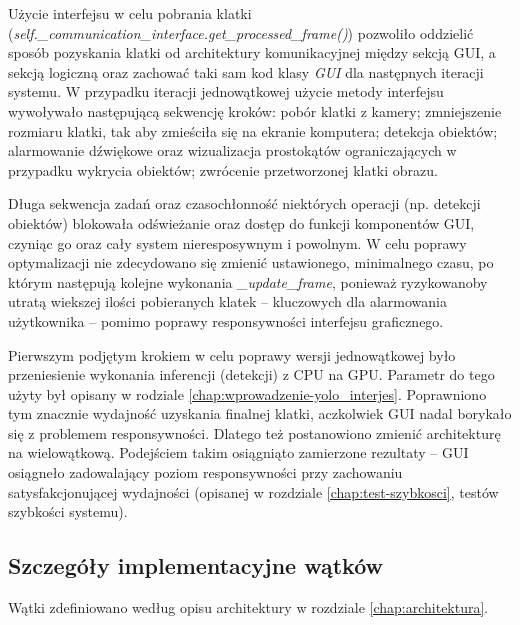 Użycie interfejsu w celu pobrania klatki (\emph{self.\_communication\_interface.get\_processed\_frame()}) pozwoliło oddzielić sposób pozyskania klatki od architektury komunikacyjnej między sekcją GUI, a sekcją logiczną oraz zachować taki sam kod klasy \emph{GUI} dla następnych iteracji systemu. W przypadku iteracji jednowątkowej użycie metody interfejsu wywoływało następującą sekwencję kroków: pobór klatki z kamery; zmniejszenie rozmiaru klatki, tak aby zmieściła się na ekranie komputera; detekcja obiektów; alarmowanie dźwiękowe oraz wizualizacja prostokątów ograniczających w przypadku wykrycia obiektów; zwrócenie przetworzonej klatki obrazu.

Długa sekwencja zadań oraz czasochłonność niektórych operacji (np. detekcji obiektów) blokowała odświeżanie oraz dostęp do funkcji komponentów GUI, czyniąc go oraz cały system nieresposywnym i powolnym. W celu poprawy optymalizacji nie zdecydowano się zmienić ustawionego, minimalnego czasu, po którym następują kolejne wykonania \emph{\_update\_frame}, ponieważ ryzykowanoby utratą wiekszej ilości pobieranych klatek -- kluczowych dla alarmowania użytkownika -- pomimo poprawy responsywności interfejsu graficznego.

Pierwszym podjętym krokiem w celu poprawy wersji jednowątkowej było przeniesienie wykonania inferencji (detekcji) z CPU na GPU. Parametr do tego użyty był opisany w rodziale \ref{chap:wprowadzenie-yolo_interjes}. Poprawniono tym znacznie wydajność uzyskania finalnej klatki, aczkolwiek GUI nadal borykało się z problemem responsywności. Dlatego też postanowiono zmienić architekturę na wielowątkową. Podejściem takim osiągniąto zamierzone rezultaty -- GUI osiągneło zadowalający poziom responsywności przy zachowaniu satysfakcjonującej wydajności (opisanej w rozdziale \ref{chap:test-szybkosci}, testów szybkości systemu).







\subsection{Szczegóły implementacyjne wątków}
Wątki zdefiniowano według opisu architektury w rozdziale \ref{chap:architektura}. 

